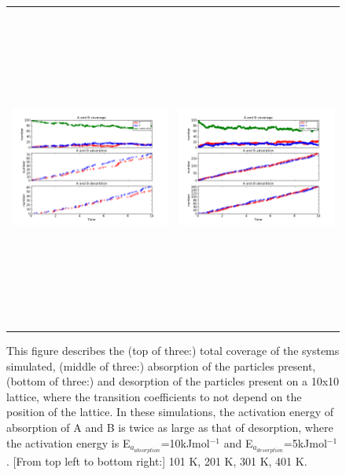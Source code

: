 \documentclass[11pt]{article}
\begin{document}
\begin{figure}[h!]
\begin{tabular}{cc}
\includegraphics[width=3.5in, height=4.2in]{./coadsorb/AtoBcoadsorb10x10_301_absorb2x__Ea10E3_Ed5E3_1.png} &
\includegraphics[width=3.5in, height=4.2in]{./coadsorb/AtoBcoadsorb10x10_401_absorb2x__Ea10E3_Ed5E3_1.png} 
\end{tabular}
\caption{This figure describes the (top of three:) total coverage of the systems simulated, (middle of three:) absorption of the particles present, (bottom of three:) and desorption of the particles present on a 10x10 lattice, where the transition coefficients to not depend on the position of the lattice. In these simulations, the activation energy of absorption of A and B is twice as large as that of desorption, where the activation energy is E$_{a_{absorption}}$=10kJmol$^{-1}$ and E$_{a_{desorption}}$=5kJmol$^{-1}$. [From top left to bottom right:] 101 K, 201 K, 301 K, 401 K. }
\end{figure}
\end{document}
